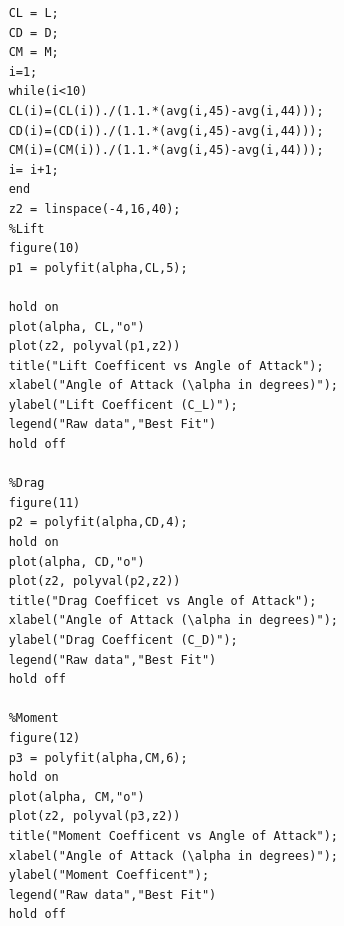 \documentclass[12pt]{article}
\begin{document}
\begin{lstlisting}
    CL = L;
    CD = D;
    CM = M;
    i=1;
    while(i<10)
    CL(i)=(CL(i))./(1.1.*(avg(i,45)-avg(i,44)));
    CD(i)=(CD(i))./(1.1.*(avg(i,45)-avg(i,44)));
    CM(i)=(CM(i))./(1.1.*(avg(i,45)-avg(i,44)));
    i= i+1;
    end
    z2 = linspace(-4,16,40);
    %Lift
    figure(10)
    p1 = polyfit(alpha,CL,5);
    
    hold on
    plot(alpha, CL,"o")
    plot(z2, polyval(p1,z2))
    title("Lift Coefficent vs Angle of Attack");
    xlabel("Angle of Attack (\alpha in degrees)");
    ylabel("Lift Coefficent (C_L)");
    legend("Raw data","Best Fit")
    hold off

    %Drag
    figure(11)
    p2 = polyfit(alpha,CD,4); 
    hold on
    plot(alpha, CD,"o")
    plot(z2, polyval(p2,z2))
    title("Drag Coefficet vs Angle of Attack");
    xlabel("Angle of Attack (\alpha in degrees)");
    ylabel("Drag Coefficent (C_D)");  
    legend("Raw data","Best Fit")
    hold off
    
    %Moment
    figure(12)
    p3 = polyfit(alpha,CM,6); 
    hold on
    plot(alpha, CM,"o")
    plot(z2, polyval(p3,z2))
    title("Moment Coefficent vs Angle of Attack");
    xlabel("Angle of Attack (\alpha in degrees)");
    ylabel("Moment Coefficent");
    legend("Raw data","Best Fit")
    hold off




\end{lstlisting}
\end{document}
